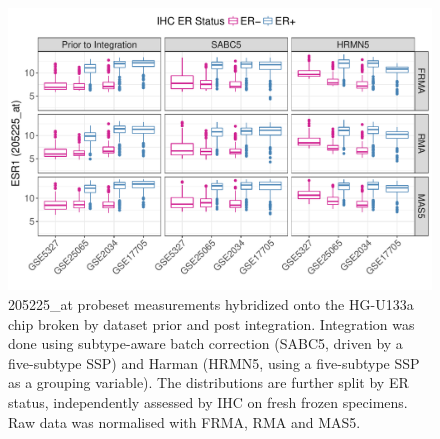 \documentclass{article}\usepackage[]{graphicx}\usepackage[]{color}
\makeatletter
\def\maxwidth{ %
  \ifdim\Gin@nat@width>\linewidth
    \linewidth
  \else
    \Gin@nat@width
  \fi
}
\newenvironment{knitrout}{}{} %
\makeatother
\begin{document}
\begin{knitrout}
\color{fgcolor}\begin{figure}

{\centering \includegraphics[width=\maxwidth]{figure/er-a-boxplots-other-1} 

}

\caption[205225\_at probeset measurements hybridized onto the HG-U133a chip broken by dataset prior and post integration]{205225\_at probeset measurements hybridized onto the HG-U133a chip broken by dataset prior and post integration.  Integration was done using subtype-aware batch correction (SABC5, driven by a five-subtype SSP) and Harman (HRMN5, using a five-subtype SSP as a grouping variable).  The distributions are further split by ER status, independently assessed by IHC on fresh frozen specimens.  Raw data was normalised with FRMA, RMA and MAS5.}\label{fig:er-a-boxplots-other}
\end{figure}


\end{knitrout}
\end{document}
